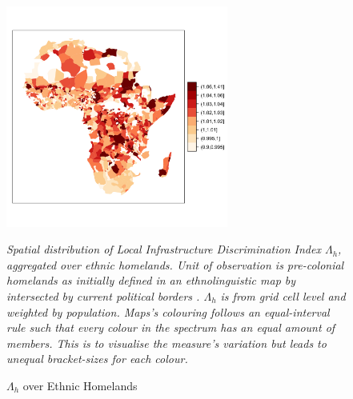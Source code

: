 \documentclass[11pt, oneside]{article}   	%
\newcommand{\mysubcaption}[1]{
\justify
\begin{spacing}{0.7}
\textit{\footnotesize #1}
\end{spacing}}
\begin{document}
\begin{figure}
\centering
\caption{$\Lambda_{h}$ over Ethnic Homelands}

\includegraphics[width=0.65\textwidth,trim={1cm 4cm 0cm 4.5cm},clip]{../../Analysis/output/other_maps/ethnicity_zeta.png}


\label{fig:ethn_maps}
\mysubcaption{Spatial distribution of Local Infrastructure Discrimination Index $\Lambda_{h}$, aggregated over ethnic homelands. Unit of observation is pre-colonial homelands as initially defined in an ethnolinguistic map by \cite{Murdock_Africaitspeoples_1959} intersected by current political borders  \citep[following][]{Michalopoulos_LongRunEffectsScramble_2016}. $\Lambda_{h}$ is from grid cell level and weighted by population. Maps's colouring follows an equal-interval rule such that every colour in the spectrum has an equal amount of members. This is to visualise the measure's variation but leads to unequal bracket-sizes for each colour.}
\end{figure}
\end{document}
